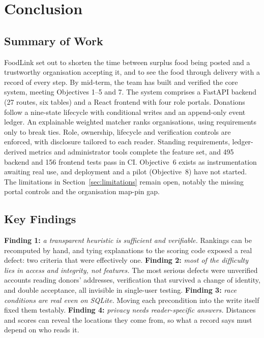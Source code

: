 \chapter{Conclusion}
\label{ch:conclusion}

\section{Summary of Work}
\label{sec:summary}

FoodLink set out to shorten the time between surplus food being posted and a
trustworthy organisation accepting it, and to see the food through delivery
with a record of every step. By mid-term, the team has built and verified the
core system, meeting Objectives 1--5 and 7. The system comprises a FastAPI
backend (27 routes, six tables) and a React frontend with four role portals.
Donations follow a nine-state lifecycle with conditional writes and an
append-only event ledger. An explainable weighted matcher ranks organisations,
using requirements only to break ties. Role, ownership, lifecycle and
verification controls are enforced, with disclosure tailored to each reader.
Standing requirements, ledger-derived metrics and administrator tools
complete the feature set, and 495 backend and 156 frontend tests pass in CI.
Objective~6 exists as instrumentation awaiting real use, and deployment and a
pilot (Objective~8) have not started. The limitations in
Section~\ref{sec:limitations} remain open, notably the missing portal controls
and the organisation map-pin gap.

\section{Key Findings}
\label{sec:findings}

\textbf{Finding 1:} \emph{a transparent heuristic is sufficient and
verifiable.} Rankings can be recomputed by hand, and tying explanations to the
scoring code exposed a real defect: two criteria that were effectively one.
\textbf{Finding 2:} \emph{most of the difficulty lies in access and integrity,
not features.} The most serious defects were unverified accounts reading donors'
addresses, verification that survived a change of identity, and double
acceptance, all invisible in single-user testing. \textbf{Finding 3:}
\emph{race conditions are real even on SQLite.} Moving each precondition into
the write itself fixed them testably. \textbf{Finding 4:} \emph{privacy needs
reader-specific answers.} Distances and scores can reveal the locations they
come from, so what a record says must depend on who reads it.

